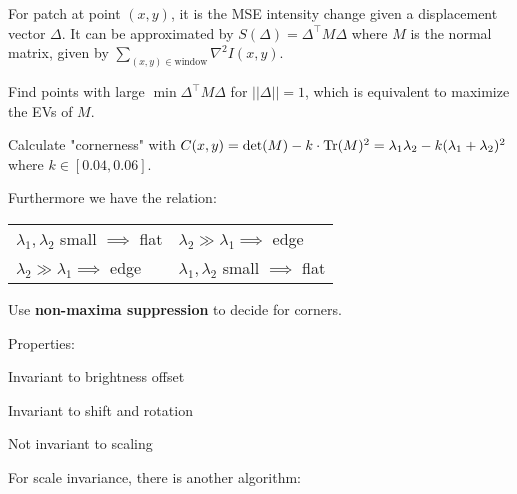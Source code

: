 \begin{definition}
For patch at point \((x, y)\), it is the MSE intensity change given a displacement vector \(\Delta\).
It can be approximated by \(S(\Delta) = \Delta^\top M \Delta\)
where \(M\) is the normal matrix, given by \(\sum_{(x, y) \in \text{window}} \nabla^2 I(x, y)\).

\end{definition}

\begin{algorithm}
  Find points with large \(\min \Delta^\top M \Delta\) for \(||\Delta|| = 1\), which is equivalent to maximize the EVs of \(M\).

  Calculate "cornerness" with \(C(x, y) = \det(M) - k \cdot \operatorname{Tr}(M)^2 = \lambda_1 \lambda_2 - k(\lambda_1 + \lambda_2)^2\) where \(k \in [0.04, 0.06]\).

  Furthermore we have the relation:

  \begin{center}
    \begin{tabularx}{\linewidth}{XX}
      \(\lambda_1, \lambda_2\) small \(\implies\) flat & \(\lambda_2 \gg \lambda_1 \implies\) edge \\
      \(\lambda_2 \gg \lambda_1 \implies\) edge & \(\lambda_1, \lambda_2\) small \(\implies\) flat
    \end{tabularx}
  \end{center}

  Use \textbf{non-maxima suppression} to decide for corners.

  Properties:
  \begin{itemize*}
    \item Invariant to brightness offset
    \item Invariant to shift and rotation
    \item Not invariant to scaling
  \end{itemize*}
\end{algorithm}

For scale invariance, there is another algorithm:


